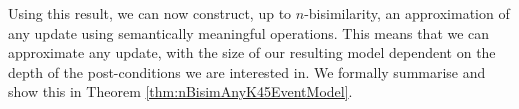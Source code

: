 %
%
%
%

Using this result, we can now construct, up to $n$-bisimilarity, an
approximation of any update using semantically meaningful operations.
This means that we can approximate any update, with the size of our resulting
model dependent on the depth of the post-conditions we are interested in.
We formally summarise and show this in Theorem
\ref{thm:nBisimAnyK45EventModel}.

